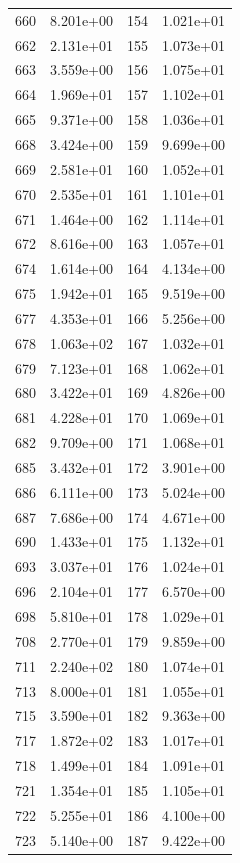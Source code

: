 \documentclass[12pt]{article}
\begin{document}
\begin{longtable}{@{}cccc@{}}
660 & 8.201e+00 & 154 & 1.021e+01 \\
662 & 2.131e+01 & 155 & 1.073e+01 \\
663 & 3.559e+00 & 156 & 1.075e+01 \\
664 & 1.969e+01 & 157 & 1.102e+01 \\
665 & 9.371e+00 & 158 & 1.036e+01 \\
668 & 3.424e+00 & 159 & 9.699e+00 \\
669 & 2.581e+01 & 160 & 1.052e+01 \\
670 & 2.535e+01 & 161 & 1.101e+01 \\
671 & 1.464e+00 & 162 & 1.114e+01 \\
672 & 8.616e+00 & 163 & 1.057e+01 \\
674 & 1.614e+00 & 164 & 4.134e+00 \\
675 & 1.942e+01 & 165 & 9.519e+00 \\
677 & 4.353e+01 & 166 & 5.256e+00 \\
678 & 1.063e+02 & 167 & 1.032e+01 \\
679 & 7.123e+01 & 168 & 1.062e+01 \\
680 & 3.422e+01 & 169 & 4.826e+00 \\
681 & 4.228e+01 & 170 & 1.069e+01 \\
682 & 9.709e+00 & 171 & 1.068e+01 \\
685 & 3.432e+01 & 172 & 3.901e+00 \\
686 & 6.111e+00 & 173 & 5.024e+00 \\
687 & 7.686e+00 & 174 & 4.671e+00 \\
690 & 1.433e+01 & 175 & 1.132e+01 \\
693 & 3.037e+01 & 176 & 1.024e+01 \\
696 & 2.104e+01 & 177 & 6.570e+00 \\
698 & 5.810e+01 & 178 & 1.029e+01 \\
708 & 2.770e+01 & 179 & 9.859e+00 \\
711 & 2.240e+02 & 180 & 1.074e+01 \\
713 & 8.000e+01 & 181 & 1.055e+01 \\
715 & 3.590e+01 & 182 & 9.363e+00 \\
717 & 1.872e+02 & 183 & 1.017e+01 \\
718 & 1.499e+01 & 184 & 1.091e+01 \\
721 & 1.354e+01 & 185 & 1.105e+01 \\
722 & 5.255e+01 & 186 & 4.100e+00 \\
723 & 5.140e+00 & 187 & 9.422e+00 \\

\end{longtable}
\end{document}
